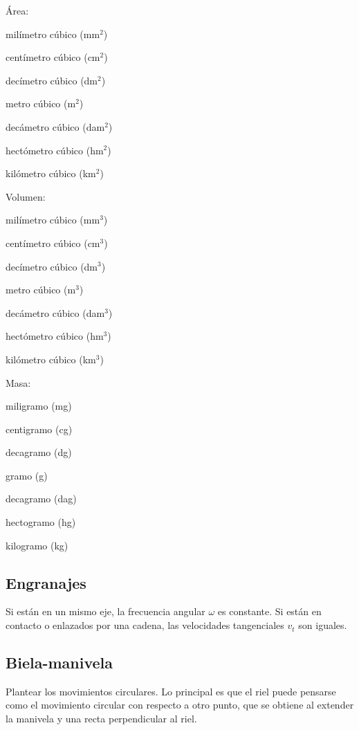 \begin{multicols}{3}
\noindent
Área:

milímetro cúbico (mm$^2$)

centímetro cúbico (cm$^2$)

decímetro cúbico (dm$^2$)

metro cúbico (m$^2$)

decámetro cúbico (dam$^2$)

hectómetro cúbico (hm$^2$)

kilómetro cúbico (km$^2$)

\vspace{1cm}
\noindent
Volumen:

milímetro cúbico (mm$^3$)

centímetro cúbico (cm$^3$)

decímetro cúbico (dm$^3$)

metro cúbico (m$^3$)

decámetro cúbico (dam$^3$)

hectómetro cúbico (hm$^3$)

kilómetro cúbico (km$^3$)

\vspace{1cm}
\noindent
Masa:

miligramo (mg)

centigramo (cg)

decagramo (dg)

gramo (g)

decagramo (dag)

hectogramo (hg)

kilogramo (kg)
\end{multicols}


\newpage
\subsection*{Engranajes}

Si están en un mismo eje, la frecuencia angular $\omega$ es constante. Si están en contacto o enlazados por una cadena, las velocidades tangenciales $v_t$ son iguales.


\subsection*{Biela-manivela}

Plantear los movimientos circulares. Lo principal es que el riel puede pensarse como el movimiento circular con respecto a otro punto, que se obtiene al extender la manivela y una recta perpendicular al riel.